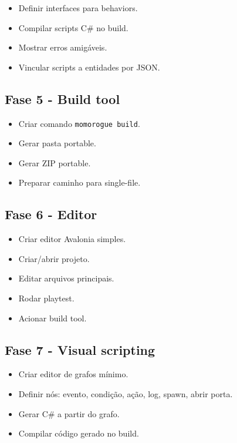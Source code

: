 \documentclass[12pt,a4paper]{article}
\begin{document}
\begin{itemize}
    \item Definir interfaces para behaviors.
    \item Compilar scripts C\# no build.
    \item Mostrar erros amigáveis.
    \item Vincular scripts a entidades por JSON.
\end{itemize}

\subsection{Fase 5 - Build tool}

\begin{itemize}
    \item Criar comando \texttt{momorogue build}.
    \item Gerar pasta portable.
    \item Gerar ZIP portable.
    \item Preparar caminho para single-file.
\end{itemize}

\subsection{Fase 6 - Editor}

\begin{itemize}
    \item Criar editor Avalonia simples.
    \item Criar/abrir projeto.
    \item Editar arquivos principais.
    \item Rodar playtest.
    \item Acionar build tool.
\end{itemize}

\subsection{Fase 7 - Visual scripting}

\begin{itemize}
    \item Criar editor de grafos mínimo.
    \item Definir nós: evento, condição, ação, log, spawn, abrir porta.
    \item Gerar C\# a partir do grafo.
    \item Compilar código gerado no build.
\end{itemize}
\end{document}
